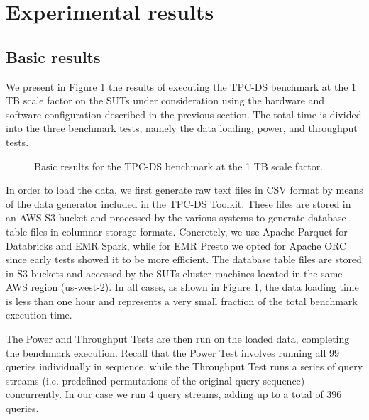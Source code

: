 \section{Experimental results}

\subsection{Basic results}\label{basicResults}

We present in Figure \ref{fig:basicResults} the results of executing the TPC-DS benchmark at the 1 TB scale factor on the SUTs under consideration using the hardware and software configuration described in the previous section. The total time is divided into the three benchmark tests, namely the data loading, power, and throughput tests.

\begin{figure}
   \begin{center}
   \end{center}
   \caption{Basic results for the TPC-DS benchmark at the 1 TB scale factor.}
   \label{fig:basicResults}
\end{figure}

In order to load the data, we first generate raw text files in CSV format by means of the data generator included in the TPC-DS Toolkit. These files are stored in an AWS S3 bucket and processed by the various systems to generate database table files in columnar storage formats. Concretely, we use Apache Parquet for Databricks and EMR Spark, while for EMR Presto we opted for Apache ORC since early tests showed it to be more efficient. The database table files are stored in S3 buckets and accessed by the SUTs cluster machines located in the same AWS region (us-west-2). In all cases, as shown in Figure \ref{fig:basicResults}, the data loading time is less than one hour and represents a very small fraction of the total benchmark execution time.

The Power and Throughput Tests are then run on the loaded data, completing the benchmark execution. Recall that the Power Test involves running all 99 queries individually in sequence, while the Throughput Test runs a series of query streams (i.e. predefined permutations of the original query sequence) concurrently. In our case we run 4 query streams, adding up to a total of 396 queries.

